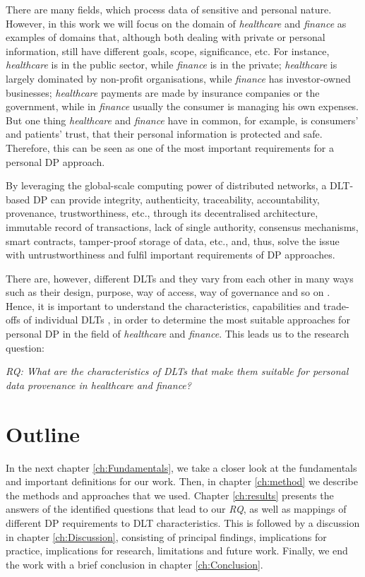 There are many fields, which process data of sensitive and personal nature. However, in this work we will focus on the domain of \textit{healthcare} and \textit{finance} as examples of domains that, although both dealing with private or personal information, still have different goals, scope, significance, etc. For instance, \textit{healthcare} is in the public sector, while \textit{finance} is in the private; \textit{healthcare} is largely dominated by non-profit organisations, while \textit{finance} has investor-owned businesses; \textit{healthcare} payments are made by insurance companies or the government, while in \textit{finance} usually the consumer is managing his own expenses. But one thing \textit{healthcare} and \textit{finance} have in common, for example, is consumers' and patients' trust, that their personal information is protected and safe. Therefore, this can be seen as one of the most important requirements for a personal DP approach.

By leveraging the global-scale computing power of distributed networks, a DLT-based DP can provide integrity, authenticity, traceability, accountability, provenance, trustworthiness, etc., through its decentralised architecture, immutable record of transactions, lack of single authority, consensus mechanisms, smart contracts, tamper-proof storage of data, etc., \cite{walmart,health_1,DP_storagesys} and, thus, solve the issue with untrustworthiness and fulfil important requirements of DP approaches.

There are, however, different DLTs and they vary from each other in many ways such as their design, purpose, way of access, way of governance and so on \cite{dlt_3}. Hence, it is important to understand the characteristics, capabilities and trade-offs of individual DLTs \cite{dlt_4}, in order to determine the most suitable approaches for personal DP in the field of \textit{healthcare} and \textit{finance}. This leads us to the research question: \newline

\textit{RQ: What are the characteristics of DLTs that make them suitable for personal data provenance in healthcare and finance?}

\section{Outline}
\label{sec:outline}

In the next chapter \ref{ch:Fundamentals}, we take a closer look at the fundamentals and important definitions for our work. Then, in chapter \ref{ch:method} we describe the methods and approaches that we used. Chapter \ref{ch:results} presents the answers of the identified questions that lead to our \textit{RQ}, as well as mappings of different DP requirements to DLT characteristics. This is followed by a discussion in chapter \ref{ch:Discussion}, consisting of principal findings, implications for practice, implications for research, limitations and future work. Finally, we end the work with a brief conclusion in chapter \ref{ch:Conclusion}.

\newpage